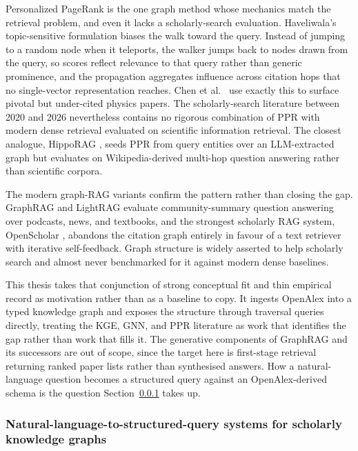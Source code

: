 Personalized PageRank is the one graph method whose mechanics match the
retrieval problem, and even it lacks a scholarly-search evaluation.
Haveliwala's topic-sensitive formulation \cite{haveliwala2002tspr}
biases the walk toward the query. Instead of jumping to a random node
when it teleports, the walker jumps back to nodes drawn from the
query, so scores reflect relevance to that query rather than generic
prominence, and the propagation aggregates influence across citation
hops that no single-vector representation reaches.  Chen et al.\ \cite{chen2007gems}
use exactly this to surface pivotal but under-cited physics papers.
The scholarly-search literature between 2020 and 2026 nevertheless
contains no rigorous combination of PPR with modern dense retrieval
evaluated on scientific information retrieval.  The closest analogue, HippoRAG
\cite{jimenezgutierrez2024hipporag}, seeds PPR from query entities over
an LLM-extracted graph but evaluates on Wikipedia-derived multi-hop
question answering rather than scientific corpora.

The modern graph-RAG variants confirm the pattern rather than closing
the gap.  GraphRAG \cite{edge2024graphrag} and LightRAG
\cite{guo2024lightrag} evaluate community-summary question answering
over podcasts, news, and textbooks, and the strongest scholarly RAG
system, OpenScholar \cite{asai2024openscholar}, abandons the citation
graph entirely in favour of a text retriever with iterative
self-feedback.  Graph structure is widely asserted to help scholarly
search and almost never benchmarked for it against modern dense
baselines.

This thesis takes that conjunction of strong conceptual fit and thin
empirical record as motivation rather than as a baseline to copy.  It
ingests OpenAlex into a typed knowledge graph and exposes the structure
through traversal queries directly, treating the KGE, GNN, and PPR
literature as work that identifies the gap rather than work that fills
it.  The generative components of GraphRAG and its successors are out
of scope, since the target here is first-stage retrieval returning
ranked paper lists rather than synthesised answers.  How a
natural-language question becomes a structured query against an
OpenAlex-derived schema is the question Section~\ref{sec:lr-nl2q} takes
up.

\subsubsection{Natural-language-to-structured-query systems for scholarly knowledge graphs}
\label{sec:lr-nl2q}

